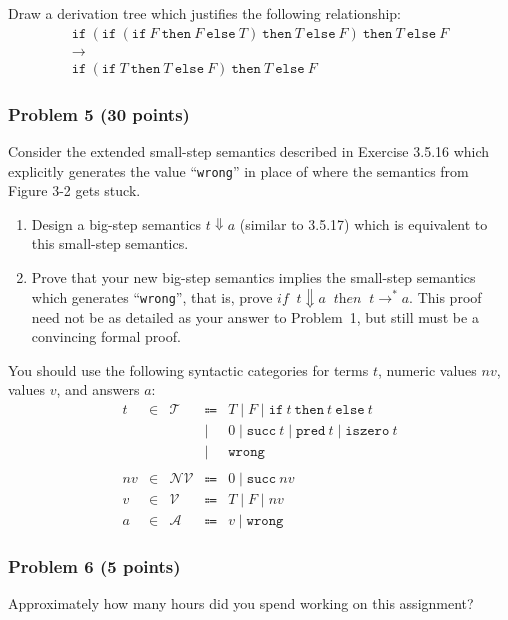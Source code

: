 \documentclass{article}
\begin{document}
Draw a derivation tree which justifies the following relationship:
\begin{gather*} 
  \texttt{if}
   \ (\texttt{if}
     \ (\texttt{if}\ F\ \texttt{then}\ F\ \texttt{else}\ T)
     \ \texttt{then}\ T
     \ \texttt{else}\ F)
   \ \texttt{then}\ T
   \ \texttt{else}\ F 
   \\ \longrightarrow
   \\ 
  \texttt{if}
   \ (\texttt{if}
     \ T
     \ \texttt{then}\ T
     \ \texttt{else}\ F)
   \ \texttt{then}\ T
   \ \texttt{else}\ F 
\end{gather*}

\subsubsection*{Problem 5 (30 points)}

Consider the extended small-step semantics described in Exercise 3.5.16 which
explicitly generates the value ``\texttt{wrong}'' in place of where the
semantics from Figure 3-2 gets stuck.
\begin{enumerate}
\item
  Design a big-step semantics $t \Downarrow a$ (similar to 3.5.17) which is
  equivalent to this small-step semantics.
\item
  Prove that your new big-step semantics implies the small-step semantics which
    generates ``\texttt{wrong}'', that is, prove $\textit{if}\;\;t \Downarrow
    a\;\;\textit{then}\;\;t \longrightarrow^* a$. This proof need not be as
    detailed as your answer to Problem~1, but still must be a convincing formal
    proof.
\end{enumerate}
You should use the following syntactic categories for terms $t$, numeric values
$nv$, values $v$, and answers $a$:
\[ \begin{array}{rcrcl}
     t {}&{} \in {}&{} \mathcal{T} {}&{} \Coloneqq {}&{} T \mid F \mid \texttt{if}\ t\ \texttt{then}\ t\ \texttt{else}\ t
  \\   {}&{}     {}&{}             {}&{} \mid      {}&{} 0 \mid \texttt{succ}\ t \mid \texttt{pred}\ t \mid \texttt{iszero}\ t
  \\   {}&{}     {}&{}             {}&{} \mid      {}&{} \texttt{wrong}
  \\ 
  \\  nv {}&{} \in {}&{} \mathcal{NV} {}&{} \Coloneqq {}&{} 0 \mid \texttt{succ}\ nv
  \\  v  {}&{} \in {}&{} \mathcal{V}  {}&{} \Coloneqq {}&{} T \mid F \mid nv
  \\  a  {}&{} \in {}&{} \mathcal{A}  {}&{} \Coloneqq {}&{} v \mid \texttt{wrong}
  \
   \end{array}
\]


\subsubsection*{Problem 6 (5 points)}

Approximately how many hours did you spend working on this assignment?
\end{document}
